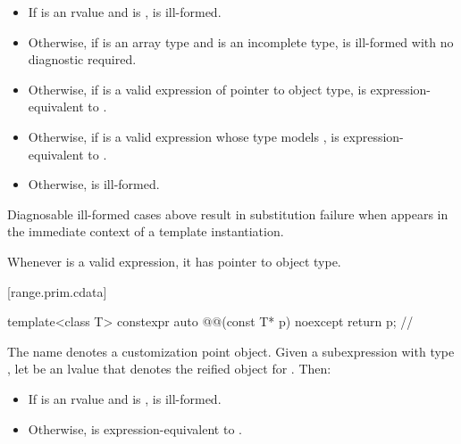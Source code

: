 \begin{itemize}
\item
  If  is an rvalue and
   is ,
   is ill-formed.

\item
  Otherwise, if  is an array type and
   is an incomplete type,
   is ill-formed with no diagnostic required.

\item
  Otherwise, if 
  is a valid expression of pointer to object type,
   is expression-equivalent to
  .

\item
  Otherwise, if 
  is a valid expression whose type models
  ,
   is expression-equivalent to
  .

\item
  Otherwise,  is ill-formed.
\end{itemize}

\pnum
\begin{note}
Diagnosable ill-formed cases above
result in substitution failure when 
appears in the immediate context of a template instantiation.
\end{note}

\pnum
\begin{note}
Whenever  is a valid expression, it
has pointer to object type.
\end{note}

[range.prim.cdata]{}
%

\begin{codeblock}
template<class T>
constexpr auto @@(const T* p) noexcept { return p; }  // \expos
\end{codeblock}

\pnum
The name  denotes a customization point
object.
Given a subexpression  with type ,
let  be an lvalue that denotes the reified object for .
Then:
\begin{itemize}
\item
If  is an rvalue and
 is ,
 is ill-formed.
\item
Otherwise,
 is expression-equivalent to
.
\end{itemize}

